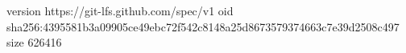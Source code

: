 version https://git-lfs.github.com/spec/v1
oid sha256:4395581b3a09905ce49ebc72f542c8148a25d8673579374663c7e39d2508c497
size 626416
